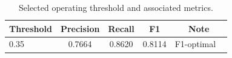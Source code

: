 \begin{table}[ht]
\centering
\small
\begin{tabular}{lcccc}
\toprule
Threshold & Precision & Recall & F1 & Note \\
\midrule
0.35 & 0.7664 & 0.8620 & 0.8114 & F1-optimal \
\bottomrule
\end{tabular}
\caption{Selected operating threshold and associated metrics.}
\label{tab:threshold}
\end{table}